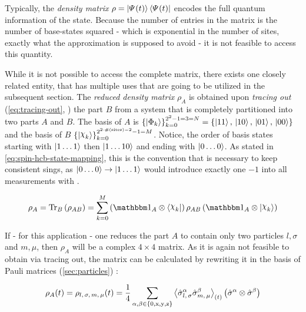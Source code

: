 Typically, the \emph{density matrix} $\rho = \ketpsiof[]{t}\brapsiof[]{t}$ encodes the full quantum information of the state. 
Because the number of entries in the matrix is the number of base-states squared - which is exponential in the number of sites, exactly what the approximation is supposed to avoid - it is not feasible to access this quantity.

While it is not possible to access the complete matrix, there exists one closely related entity, that has multiple uses that are going to be utilized in the subsequent section.
The \emph{reduced density matrix} $\rho_A$ is obtained upon \emph{tracing out} (\autoref{eq:tracing-out}, \cite{partialTraceEntanglementOfSubsystemsBlochVector}) the part $B$ from a system that is completely partitioned into two parts $A$ and $B$.
The basis of $A$ is $\left\{\ketN[\Phi_k]\right\}_{k=0}^{2^{2}-1 = 3 = N} = \left\{\ketN[11],\,\ketN[10],\,\ketN[01],\,\ketN[00]\right\}$ and the basis of $B$ $\left\{\ketN[\Chi_k]\right\}_{k=0}^{2^{2 \cdot \#\left(\text{sites}\right) - 2}-1 = M}$.
Notice, the order of basis states starting with $\ketN[1\dots1]$ then $\ketN[1\dots10]$ and ending with $\ketN[0\dots0]$. As stated in \autoref{eq:spin-hcb-state-mapping}, this is the convention that is necessary to keep consistent sings, as $\ketN[0\dots0] \rightarrow \ketN[1\dots1]$ would introduce exactly one $-1$ into all measurements with .

\begin{equation}
    \label{eq:tracing-out}
    \rho_A = \partialTrace{B}{\rho_{AB}} = \sum\limits_{k=0}^{M} \left(\one[A]\otimes\braN[\Chi_k] \right)\rho_{AB}\left(\one[A]\otimes\ketN[\Chi_k]\right)
\end{equation}

If - for this application - one reduces the part $A$ to contain only two particles $l, \sigma$ and $m, \mu$, then $\rho_A$ will be a complex $4\times 4$ matrix.
As it is again not feasible to obtain via tracing out, the matrix can be calculated by rewriting it in the basis of Pauli matrices (\ref{sec:particles}) \cite{isingDynamicsWithClassicalNetworks}:

\begin{equation}
    \label{eq:reduced-density-matrix-via-paulis}
    \rho_A (t) = \rho_{l,\,\sigma,\,m,\,\mu} (t) = \frac{1}{4} \sum\limits_{\alpha,\beta\in\left\{0,\text{x},\text{y},\text{z}\right\}}
    \timeExpectationVal{ \pauli[l,\,\sigma]{$\alpha$}\pauli[m,\,\mu]{$\beta$} } \left(\pauli[]{$\alpha$}\otimes\pauli[]{$\beta$}\right)
\end{equation}

